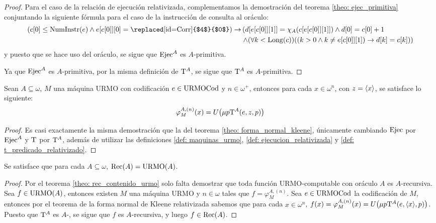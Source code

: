 \begin{agregado}
\begin{proof}
	Para el caso de la relación de ejecución relativizada,  complementamos la demostración del teorema \ref{theo: ejec_primitiva} conjuntando la siguiente fórmula para el caso de la instrucción de consulta al oráculo:
	\begin{align*}
		\pa*{c\bra*{0}\leq\NUMINSTRUCCIONES\pa*{e}\land e\bra*{c\bra*{0}}\bra*{0} =\mbox{\replaced[id=Corr]{$4$}{$0$}}}\to&\left(d\bra*{e\bra*{c\bra*{0}}\bra*{1}} =\CARACTERISTICA{A}\pa*{c\bra*{e\bra*{c\bra*{0}}\bra*{1}}}\land d\bra*{0} = c\bra*{0} + 1\right.\\
		&\left.\land\pa*{\forall k <\LONGITUD\pa*{c}}\pa*{\pa*{k > 0\land k\neq e\bra*{c\bra*{0}}\bra*{1}}\to d\bra*{k} = c\bra*{k}}\right)
	\end{align*}
	y puesto que se hace uso del oráculo, se sigue que $\EJECUCION^{A}$ es $A$-primitiva.

	Ya que $\EJECUCION^{A}$ es $A$-primitiva, por la misma definición de $\KLEENE[A]$, se sigue que $\KLEENE[A]$ es $A$-primitiva.
\end{proof}

\begin{theorem}
	\label{theo: forma_normal_kleene_relativizada}
	Sean $A\subseteq\omega$, $M$ una máquina URMO con codificación $e\in\URMOCODIGO$ y $n\in\omega^{+}$, entonces para cada $x\in\omega^{n}$, con $z =\inner*{x}$, se satisface lo siguiente:
	\[
		\varphi_{M}^{A, (n)}\pa*{x} = U\pa*{\mu p\KLEENE[A]\pa*{e, z, p}}
	\]
\end{theorem}

\begin{proof}
	Es casi exactamente la misma demostración que la del teorema \ref{theo: forma_normal_kleene}, únicamente cambiando $\EJECUCION$ por $\EJECUCION^{A}$ y $\KLEENE$ por $\KLEENE[A]$, además de utilizar las definiciones \ref{def: maquinas_urmo}, \ref{def: ejecucion_relativizada} y \ref{def: t_predicado_relativizado}.
\end{proof}

\begin{coll}
	\label{coll: rec_igual_urmo}
	Se satisface que para cada $A\subseteq\omega$, $\RECURSIVO\pa*{A} =\URMO\pa*{A}$.
\end{coll}

\begin{proof}
	Por el teorema \ref{theo: rec_contenido_urmo} solo falta demostrar que toda función URMO-computable con oráculo $A$ es $A$-recursiva. Sea $f\in\URMO\pa*{A}$, entonces existen $M$ una máquina URMO y $n\in\omega$ tales que $f =\varphi_{M}^{A, (n)}$. Sea $e\in\URMOCODIGO$ la codificación de $M$, entonces por el teorema de la forma normal de Kleene relativizada sabemos que para cada $x\in\omega^{n}$, $f\pa*{x} =\varphi_{M}^{A, (n)}\pa*{x} = U\pa*{\mu p\KLEENE[A]\pa*{e,\inner*{x}, p}}$. Puesto que $\KLEENE[A]$ es $A$-, se sigue que $f$ es $A$-recursiva, y luego $f\in\RECURSIVO\pa*{A}$.
\end{proof}
\end{agregado}

